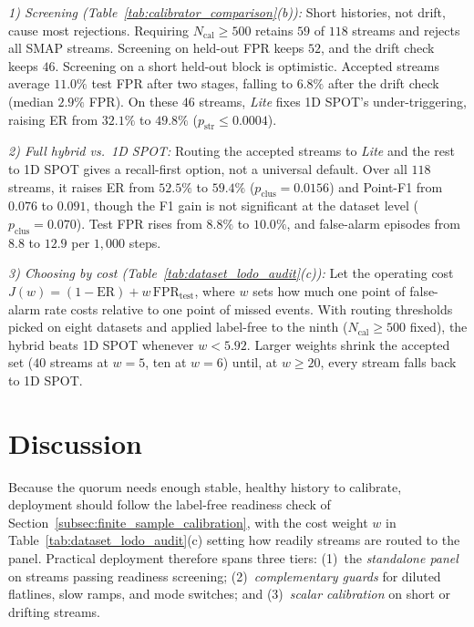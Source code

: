 \documentclass[journal]{IEEEtran}
\begin{document}
\noindent\emph{1) Screening (Table~\ref{tab:calibrator_comparison}(b)):} Short histories, not drift, cause most rejections. Requiring $N_{\text{cal}}\ge 500$ retains $59$ of $118$ streams and rejects all SMAP streams. Screening on held-out FPR keeps $52$, and the drift check keeps $46$. Screening on a short held-out block is optimistic. Accepted streams average $11.0\%$ test FPR after two stages, falling to $6.8\%$ after the drift check (median $2.9\%$ FPR). On these $46$ streams, \emph{Lite} fixes 1D SPOT's under-triggering, raising ER from $32.1\%$ to $49.8\%$ ($p_{\text{str}}\le 0.0004$).

\noindent\emph{2) Full hybrid vs.\ 1D SPOT:} Routing the accepted streams to \emph{Lite} and the rest to 1D SPOT gives a recall-first option, not a universal default. Over all $118$ streams, it raises ER from $52.5\%$ to $59.4\%$ ($p_{\text{clus}}=0.0156$) and Point-F1 from $0.076$ to $0.091$, though the F1 gain is not significant at the dataset level ($p_{\text{clus}}=0.070$). Test FPR rises from $8.8\%$ to $10.0\%$, and false-alarm episodes from $8.8$ to $12.9$ per $1{,}000$ steps.

\noindent\emph{3) Choosing by cost (Table~\ref{tab:dataset_lodo_audit}(c)):} Let the operating cost $J(w) = (1 - \text{ER}) + w\,\text{FPR}_{\text{test}}$, where $w$ sets how much one point of false-alarm rate costs relative to one point of missed events. With routing thresholds picked on eight datasets and applied label-free to the ninth ($N_{\text{cal}}\ge 500$ fixed), the hybrid beats 1D SPOT whenever $w<5.92$. Larger weights shrink the accepted set ($40$ streams at $w=5$, ten at $w=6$) until, at $w\ge 20$, every stream falls back to 1D SPOT.

\vspace{-4pt}
\section{Discussion}
\label{sec:discussion}
Because the quorum needs enough stable, healthy history to calibrate, deployment should follow the label-free readiness check of Section~\ref{subsec:finite_sample_calibration}, with the cost weight $w$ in Table~\ref{tab:dataset_lodo_audit}(c) setting how readily streams are routed to the panel. Practical deployment therefore spans three tiers: (1)~the \emph{standalone panel} on streams passing readiness screening; (2)~\emph{complementary guards} for diluted flatlines, slow ramps, and mode switches; and (3)~\emph{scalar calibration} on short or drifting streams.
\end{document}
